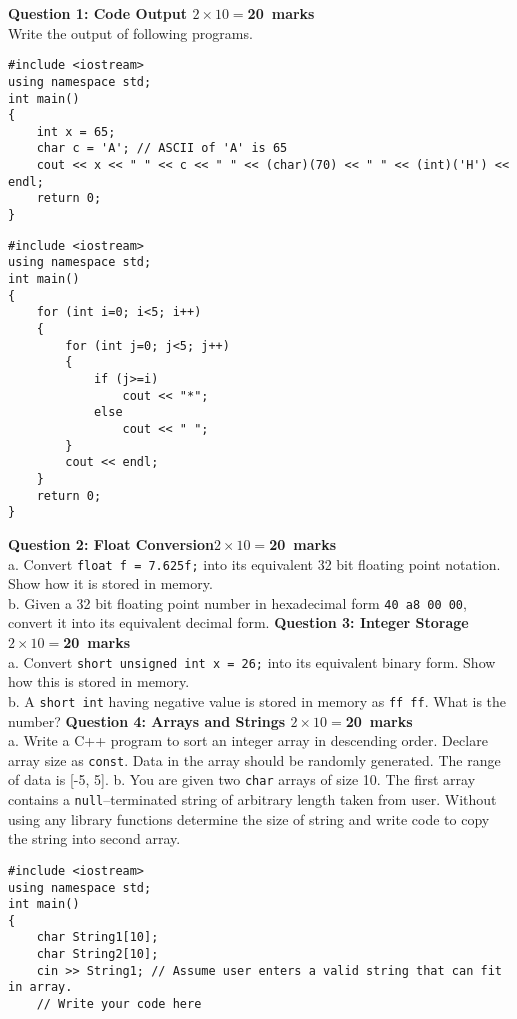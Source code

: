 \documentclass[12pt,a4paper]{article}
\def\Qone{20}
\def\Qtwo{20}
\def\Qthree{20}
\def\Qfour{20}
\begin{document}
\newpage
\pagestyle{fancy}
\noindent\textbf{Question 1: Code Output \hfill $2\times10=$\Qone~marks}\\
Write the output of following programs.
\begin{lstlisting}
#include <iostream>
using namespace std;
int main()
{
	int x = 65;
	char c = 'A'; // ASCII of 'A' is 65
	cout << x << " " << c << " " << (char)(70) << " " << (int)('H') << endl;
	return 0;
}
\end{lstlisting}
\vspace{3cm}
\begin{lstlisting}
#include <iostream>
using namespace std;
int main()
{
	for (int i=0; i<5; i++)
	{
		for (int j=0; j<5; j++)
		{
			if (j>=i)
				cout << "*";
			else
				cout << " ";
		}
		cout << endl;
	}
	return 0;
}
\end{lstlisting}
\newpage
\noindent \textbf{Question 2: Float Conversion\hfill $2\times10=$\Qtwo~marks}\\
a. Convert \verb|float f = 7.625f;| into its equivalent 32 bit floating point notation. Show how it is stored in memory.\\[12.5cm]
b. Given a 32 bit floating point number in hexadecimal form \verb|40 a8 00 00|, convert it into its equivalent decimal form.
\newpage
\noindent\textbf{Question 3: Integer Storage\hfill $2\times10=$\Qthree~marks}\\
a. Convert \verb|short unsigned int x = 26;| into its equivalent binary form. Show how this is stored in memory.\\[12.5cm]
b. A \verb|short int| having negative value is stored in memory as \verb|ff ff|. What is the number?
\newpage
\noindent\textbf{Question 4: Arrays and Strings \hfill $2\times10=$\Qfour~marks}\\
a. Write a C++ program to sort an integer array in descending order. Declare array size as \verb|const|. Data in the array should be randomly generated. The range of data is [-5, 5].
\newpage
\noindent b. You are given two \verb|char| arrays of size 10. The first array contains a \verb|null|--terminated string of arbitrary length taken from user. Without using any library functions determine the size of string and write code to copy the string into second array.
\begin{lstlisting}
#include <iostream>
using namespace std;
int main()
{
	char String1[10];
	char String2[10];
	cin >> String1; // Assume user enters a valid string that can fit in array.
	// Write your code here
\end{lstlisting}
\end{document}
